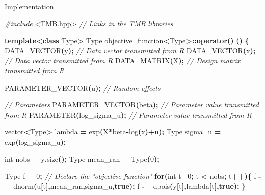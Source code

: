 \documentclass[aspectratio=169]{beamer}
\newenvironment{Shaded}{\begin{snugshade}}{\end{snugshade}}
\newcommand{\CommentTok}[1]{\textcolor[rgb]{0.56,0.35,0.01}{\textit{#1}}}
\newcommand{\ControlFlowTok}[1]{\textcolor[rgb]{0.13,0.29,0.53}{\textbf{#1}}}
\newcommand{\DataTypeTok}[1]{\textcolor[rgb]{0.13,0.29,0.53}{#1}}
\newcommand{\DecValTok}[1]{\textcolor[rgb]{0.00,0.00,0.81}{#1}}
\newcommand{\ImportTok}[1]{#1}
\newcommand{\KeywordTok}[1]{\textcolor[rgb]{0.13,0.29,0.53}{\textbf{#1}}}
\newcommand{\NormalTok}[1]{#1}
\newcommand{\OperatorTok}[1]{\textcolor[rgb]{0.81,0.36,0.00}{\textbf{#1}}}
\newcommand{\PreprocessorTok}[1]{\textcolor[rgb]{0.56,0.35,0.01}{\textit{#1}}}
\begin{document}
\begin{frame}[fragile]{Implementation}
\tiny

\begin{Shaded}
\begin{Highlighting}[]
\PreprocessorTok{\#include }\ImportTok{\textless{}TMB.hpp\textgreater{}}\PreprocessorTok{              }\CommentTok{// Links in the TMB libraries}

\KeywordTok{template}\OperatorTok{\textless{}}\KeywordTok{class}\NormalTok{ Type}\OperatorTok{\textgreater{}}
\NormalTok{Type objective\_function}\OperatorTok{\textless{}}\NormalTok{Type}\OperatorTok{\textgreater{}::}\KeywordTok{operator}\OperatorTok{()} \OperatorTok{()}
\OperatorTok{\{}
\NormalTok{  DATA\_VECTOR}\OperatorTok{(}\NormalTok{y}\OperatorTok{);}                               \CommentTok{// Data vector transmitted from R}
\NormalTok{  DATA\_VECTOR}\OperatorTok{(}\NormalTok{x}\OperatorTok{);}                       \CommentTok{// Data vector transmitted from R}
\NormalTok{  DATA\_MATRIX}\OperatorTok{(}\NormalTok{X}\OperatorTok{);}                       \CommentTok{// Design matrix transmitted from R}
  
\NormalTok{  PARAMETER\_VECTOR}\OperatorTok{(}\NormalTok{u}\OperatorTok{);}                      \CommentTok{// Random effects}
  
  \CommentTok{// Parameters}
\NormalTok{  PARAMETER\_VECTOR}\OperatorTok{(}\NormalTok{beta}\OperatorTok{);}         \CommentTok{// Parameter value transmitted from R}
\NormalTok{  PARAMETER}\OperatorTok{(}\NormalTok{log\_sigma\_u}\OperatorTok{);}               \CommentTok{// Parameter value transmitted from R}
  
\NormalTok{  vector}\OperatorTok{\textless{}}\NormalTok{Type}\OperatorTok{\textgreater{}}\NormalTok{ lambda  }\OperatorTok{=}\NormalTok{ exp}\OperatorTok{(}\NormalTok{X}\OperatorTok{*}\NormalTok{beta}\OperatorTok{{-}}\NormalTok{log}\OperatorTok{(}\NormalTok{x}\OperatorTok{)+}\NormalTok{u}\OperatorTok{);}
\NormalTok{  Type sigma\_u }\OperatorTok{=}\NormalTok{ exp}\OperatorTok{(}\NormalTok{log\_sigma\_u}\OperatorTok{);}
  
  \DataTypeTok{int}\NormalTok{ nobs }\OperatorTok{=}\NormalTok{ y}\OperatorTok{.}\NormalTok{size}\OperatorTok{();}
\NormalTok{  Type mean\_ran }\OperatorTok{=}\NormalTok{ Type}\OperatorTok{(}\DecValTok{0}\OperatorTok{);}
  
\NormalTok{  Type f }\OperatorTok{=} \DecValTok{0}\OperatorTok{;}                           \CommentTok{// Declare the "objective function"}
  \ControlFlowTok{for}\OperatorTok{(}\DataTypeTok{int}\NormalTok{ t}\OperatorTok{=}\DecValTok{0}\OperatorTok{;}\NormalTok{ t }\OperatorTok{\textless{}}\NormalTok{ nobs}\OperatorTok{;}\NormalTok{ t}\OperatorTok{++)\{}
\NormalTok{    f }\OperatorTok{{-}=}\NormalTok{ dnorm}\OperatorTok{(}\NormalTok{u}\OperatorTok{[}\NormalTok{t}\OperatorTok{],}\NormalTok{mean\_ran}\OperatorTok{,}\NormalTok{sigma\_u}\OperatorTok{,}\KeywordTok{true}\OperatorTok{);}
\NormalTok{    f }\OperatorTok{{-}=}\NormalTok{ dpois}\OperatorTok{(}\NormalTok{y}\OperatorTok{[}\NormalTok{t}\OperatorTok{],}\NormalTok{lambda}\OperatorTok{[}\NormalTok{t}\OperatorTok{],}\KeywordTok{true}\OperatorTok{);}
  \OperatorTok{\}}
  

\end{Highlighting}
\end{Shaded}
\end{frame}
\end{document}
